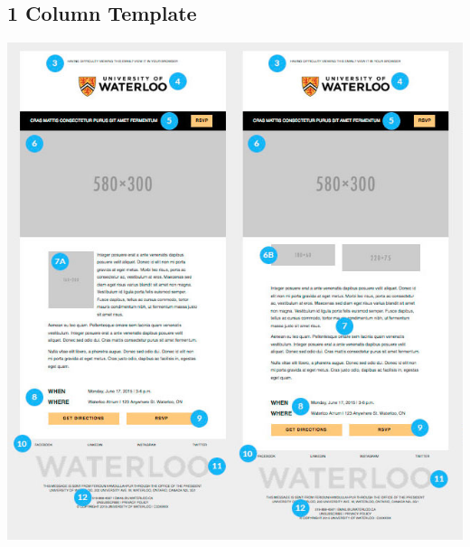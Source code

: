 \documentclass[a4paper,11pt]{article}
\begin{document}
	\subsection{1 Column Template}
	\begin{center}
	\includegraphics[scale=0.55]{images/1cols}
	\end{center}
	
\end{document}
